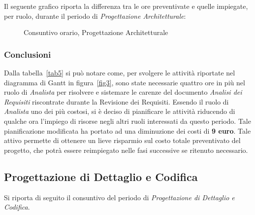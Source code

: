 \newpage
\noindent Il seguente grafico riporta la differenza tra le ore preventivate e quelle impiegate, per ruolo, durante il periodo di \textit{Progettazione Architetturale}:
\begin{figure}[h]
	\centering
	\caption{Consuntivo orario, Progettazione Architetturale}
\end{figure}

\subsubsection{Conclusioni}
Dalla tabella~\ref{tab5} si può notare come, per svolgere le attività riportate nel diagramma di \gls{Gantt} in figura~\ref{fig3}, sono state necessarie quattro ore in più nel ruolo di \textit{Analista} per risolvere e sistemare le carenze del documento \textit{Analisi dei Requisiti} riscontrate durante la Revisione dei Requisiti. Essendo il ruolo di \textit{Analista} uno dei più costosi, si è deciso di pianificare le attività riducendo di qualche ora l'impiego di risorse negli altri ruoli interessati da questo periodo. Tale pianificazione modificata ha portato ad una diminuzione dei costi di \textbf{9 euro}. Tale attivo permette di ottenere un lieve risparmio sul costo totale preventivato del progetto, che potrà essere reimpiegato nelle fasi successive se ritenuto necessario. 

\subsection{Progettazione di Dettaglio e Codifica}
Si riporta di seguito il consuntivo del periodo di \textit{Progettazione di Dettaglio e Codifica}.


